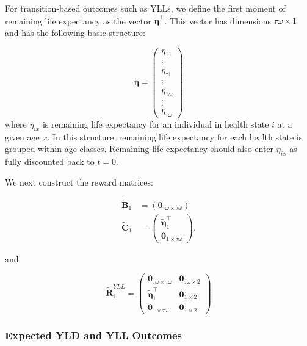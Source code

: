 \documentclass[
]{agujournal2019}
\begin{document}
For transition-based outcomes such as YLLs, we define the first moment
of remaining life expectancy as the vector
\(\widetilde{\boldsymbol{\eta}}^{\top}\). This vector has dimensions
\(\tau\omega \times 1\) and has the following basic structure:

\[
\widetilde{\mathbf{\eta}}=\left(\begin{array}{c}
\eta_{11} \\
\vdots \\
\eta_{\tau 1} \\
\hline \vdots \\
\hline \eta_{1 \omega} \\
\vdots \\
\eta_{\tau \omega}
\end{array}\right)
\] where \(\eta_{i x}\) is remaining life expectancy for an individual
in health state \(i\) at a given age \(x\). In this structure, remaining
life expectancy for each health state is grouped within age classes.
Remaining life expectancy should also enter \(\eta_{i x}\) as fully
discounted back to \(t=0\).

We next construct the reward matrices:

\[
\begin{aligned}
\widetilde{\mathbf{B}}_{1} & =\left(\mathbf{0}_{\tau \omega \times \tau \omega}\right) \\
\widetilde{\mathbf{C}}_{1} & =\left(\begin{array}{c}
\widetilde{\boldsymbol{\eta}}_{1}^{\top} \\
\mathbf{0}_{1 \times \tau \omega}
\end{array}\right) .
\end{aligned}
\]

and

\[
\widetilde{\mathbf{R}}^{YLL}_{1}=\left(\begin{array}{c|c}
\mathbf{0}_{\tau \omega \times \tau \omega} & \mathbf{0}_{\tau \omega \times 2} \\
\hline \widetilde{\boldsymbol{\eta}}_{1}^{\top} & \mathbf{0}_{1 \times 2} \\
\mathbf{0}_{1 \times \tau \omega} & \mathbf{0}_{1 \times 2}
\end{array}\right)
\]

\subsubsection{Expected YLD and YLL
Outcomes}\label{expected-yld-and-yll-outcomes}
\end{document}
